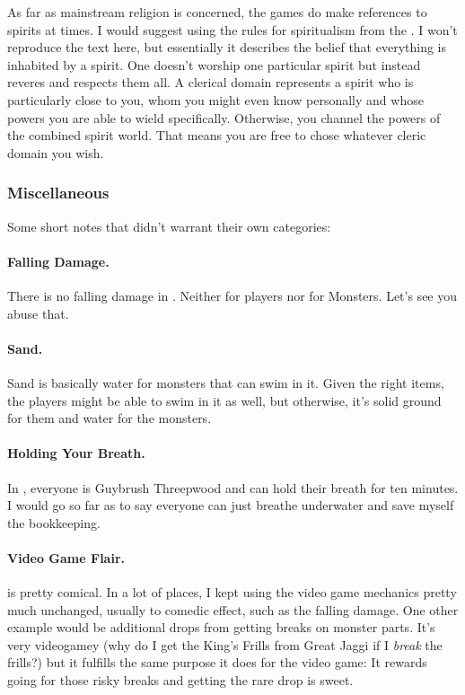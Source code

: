 As far as mainstream religion is concerned, the games do make references to spirits at times. I would suggest using the rules for spiritualism from the \DMG. I won't reproduce the text here, but essentially it describes the belief that everything is inhabited by a spirit. One doesn't worship one particular spirit but instead reveres and respects them all. A clerical domain represents a spirit who is particularly close to you, whom you might even know personally and whose powers you are able to wield specifically. Otherwise, you channel the powers of the combined spirit world. That means you are free to chose whatever cleric domain you wish.

\subsubsection{Miscellaneous}
Some short notes that didn't warrant their own categories:

\paragraph{Falling Damage.} There is no falling damage in \MH{}. Neither for players nor for Monsters. Let's see you abuse that.
\paragraph{Sand.} Sand is basically water for monsters that can swim in it. Given the right items, the players might be able to swim in it as well, but otherwise, it's solid ground for them and water for the monsters.
\paragraph{Holding Your Breath.} In \MH{}, everyone is Guybrush Threepwood and can hold their breath for ten minutes. I would go so far as to say everyone can just breathe underwater and save myself the bookkeeping.
\paragraph{Video Game Flair.} \MH{} is pretty comical. In a lot of places, I kept using the video game mechanics pretty much unchanged, usually to comedic effect, such as the falling damage. One other example would be additional drops from getting breaks on monster parts. It's very videogamey (why do I get the King's Frills from Great Jaggi if I \emph{break} the frills?) but it fulfills the same purpose it does for the video game: It rewards going for those risky breaks and getting the rare drop is sweet.
\hbWideBottomArtFirstPageFix


